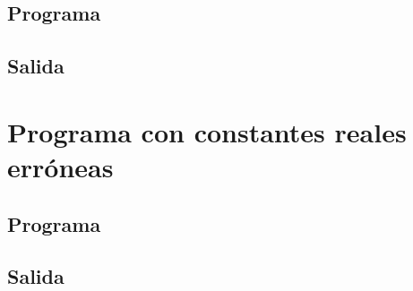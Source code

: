     \subsection{Programa}
	    
        
	
   \subsection{Salida}
	    
        

    \hfill
    \clearpage




\section{Programa con constantes reales erróneas}

    \subsection{Programa}
	    
        
	
   \subsection{Salida}
	    
        

    \hfill
    \clearpage
